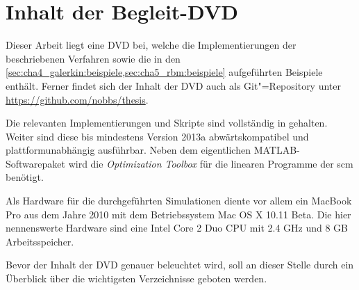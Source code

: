 \documentclass[../main.tex]{subfiles}
\begin{document}
\chapter{Inhalt der Begleit-DVD} %
\label{cha:inhalt_der_begleit_dvd}

Dieser Arbeit liegt eine DVD bei, welche die Implementierungen der beschriebenen Verfahren sowie die in den \cref{sec:cha4_galerkin:beispiele,sec:cha5_rbm:beispiele} aufgeführten Beispiele enthält.
Ferner findet sich der Inhalt der DVD auch als Git"=Repository unter \url{https://github.com/nobbs/thesis}.

Die relevanten Implementierungen und Skripte sind vollständig in \textcite{Matlab} gehalten.
Weiter sind diese bis mindestens Version 2013a abwärtskompatibel und plattformunabhängig ausführbar.
Neben dem eigentlichen MATLAB-Softwarepaket wird die \emph{Optimization Toolbox} für die linearen Programme der \acl{scm} benötigt.

Als Hardware für die durchgeführten Simulationen diente vor allem ein MacBook Pro aus dem Jahre 2010 mit dem Betriebssystem Mac OS X 10.11 Beta.
Die hier nennenswerte Hardware sind eine Intel Core 2 Duo CPU mit 2.4 GHz und 8 GB Arbeitsspeicher.

Bevor der Inhalt der DVD genauer beleuchtet wird, soll an dieser Stelle durch ein Überblick über die wichtigsten Verzeichnisse geboten werden.

\end{document}
